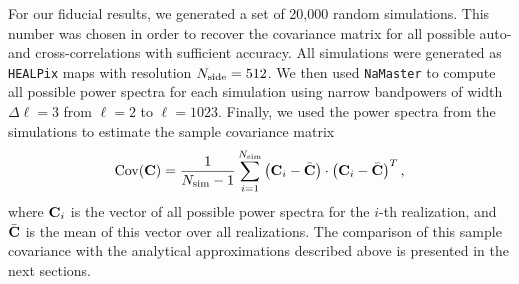 \documentclass[a4paper,11pt]{article}
\begin{document}
      For our fiducial results, we generated a set of 20,000 random simulations. This number was chosen in order to recover the covariance matrix for all possible auto- and cross-correlations with sufficient accuracy. All simulations were generated as {\tt HEALPix} maps with resolution $N_{\rm side}=512$. We then used {\tt NaMaster} to compute all possible power spectra for each simulation using narrow bandpowers of width $\Delta\ell=3$ from $\ell=2$ to $\ell=1023$. Finally, we used the power spectra from the simulations to estimate the sample covariance matrix
      \begin{equation}
        {\rm Cov}({\bf C}) =\frac{1}{N_{\rm sim}-1}\sum_{i=1}^{N_{\rm sim}}\left({\bf C}_i-\bar{\bf C}\right)\cdot\left({\bf C}_i-\bar{\bf C}\right)^T,
      \end{equation}
      where ${\bf C}_i$ is the vector of all possible power spectra for the $i$-th realization, and $\bar{\bf C}$ is the mean of this vector over all realizations. The comparison of this sample covariance with the analytical approximations described above is presented in the next sections.
\end{document}
